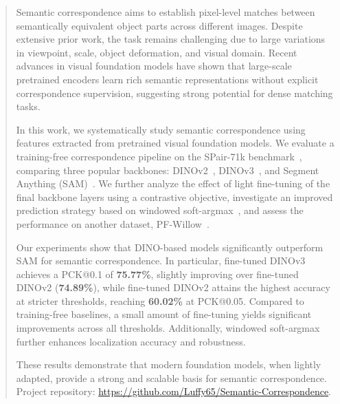 \begin{abstract}

Semantic correspondence aims to establish pixel-level matches between semantically equivalent object parts across different images.
Despite extensive prior work, the task remains challenging due to large variations in viewpoint, scale, object deformation, and visual domain.
Recent advances in visual foundation models have shown that large-scale pretrained encoders learn rich semantic representations without explicit
correspondence supervision, suggesting strong potential for dense matching tasks.

In this work, we systematically study semantic correspondence using features extracted from pretrained visual foundation models.
We evaluate a training-free correspondence pipeline on the SPair-71k benchmark~\cite{min2019spair}, comparing three popular backbones: DINOv2~\cite{oquab2023dinov2}, DINOv3~\cite{simeoni2025dinov3}, and Segment Anything (SAM)~\cite{kirillov2023segment}.
We further analyze the effect of light fine-tuning of the final backbone layers using a contrastive objective, investigate an improved prediction
strategy based on windowed soft-argmax~\cite{zhang2024telling}, and assess the performance on another dataset, PF-Willow~\cite{ham2016}.

Our experiments show that DINO-based models significantly outperform SAM for semantic correspondence. In particular,
fine-tuned DINOv3 achieves a PCK@0.1 of \textbf{75.77\%}, slightly improving over fine-tuned DINOv2 (\textbf{74.89\%}), while fine-tuned DINOv2 attains the highest accuracy at
stricter thresholds, reaching \textbf{60.02\%} at PCK@0.05. Compared to training-free baselines, a small amount of fine-tuning yields significant improvements
across all thresholds. Additionally, windowed soft-argmax further enhances localization accuracy and robustness.

These results demonstrate that modern foundation models, when lightly adapted, provide a strong and scalable basis for semantic correspondence.
Project repository: \url{https://github.com/Luffy65/Semantic-Correspondence}.

\end{abstract}